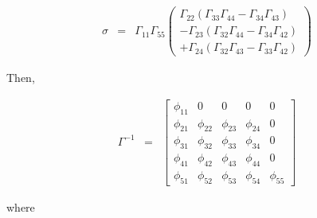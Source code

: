 \begin{eqnarray}
\sigma 
&=&
\Gamma_{11} \Gamma_{55}
\left(
\begin{array}{r}
 \Gamma_{22} \left( \Gamma_{33} \Gamma_{44} - \Gamma_{34} \Gamma_{43} \right)
\\
-\Gamma_{23} \left( \Gamma_{32} \Gamma_{44} - \Gamma_{34} \Gamma_{42} \right)
\\
+\Gamma_{24} \left( \Gamma_{32} \Gamma_{43} - \Gamma_{33} \Gamma_{42} \right)
\end{array}
\right)
\nonumber
\end{eqnarray}

Then,

\begin{eqnarray}
\Gamma^{-1}
&=&
\left[
\begin{array}{ccccc}
\phi_{11} & 0 & 0 & 0 & 0 \\
\phi_{21} & \phi_{22} & \phi_{23} & \phi_{24} & 0 \\
\phi_{31} & \phi_{32} & \phi_{33} & \phi_{34} & 0 \\
\phi_{41} & \phi_{42} & \phi_{43} & \phi_{44} & 0 \\
\phi_{51} & \phi_{52} & \phi_{53} & \phi_{54} & \phi_{55} 
\end{array}
\right]
\nonumber
\end{eqnarray}

where

